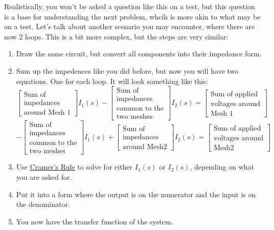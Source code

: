 \documentclass{article}
\theoremstyle{mytheoremstyle}
\theoremstyle{mytheoremstyle}
\theoremstyle{myproblemstyle}
\theoremstyle{break}
\begin{document}
Realistically, you won't be asked a question like this on a test, but this question is a base for understanding the next problem, whcih is more akin to what may be on a test. Let's talk about another scenario you may encounter, where there are now 2 loops. This is a bit more complex, but the steps are very similar:

\begin{enumerate}
	\item Draw the same circuit, but convert all components into their impedance form.
	\item Sum up the impedences like you did before, but now you will have two equations. One for each loop. It will look something like this:
	\begin{equation}
		\left.\left[\begin{array}{c}\text{Sum of}\\\text{impedances}\\\text{around Mesh 1}\end{array}\right.\right]I_1(s)-\left[\begin{array}{c}\text{Sum of}\\\text{impedances}\\\text{common to the}\\\text{two meshes}\end{array}\right]I_2(s)=\left[\begin{array}{c}\text{Sum of applied}\\\text{voltages around}\\\text{Mesh 1}\end{array}\right]
	\end{equation}
	\begin{equation}
		-\begin{bmatrix}\text{Sum of}\\\text{impedances}\\\text{common to the}\\\text{two meshes}\end{bmatrix}I_1(s)+\begin{bmatrix}\text{Sum of}\\\text{impedances}\\\text{around Mesh}2\end{bmatrix}I_2(s)=\begin{bmatrix}\text{Sum of applied}\\\text{voltages around}\\\text{Mesh}2\end{bmatrix}
	\end{equation}
	\item Use \hyperref[subsec:Cramers_Rule]{Cramer's Rule} to solve for either $I_1(s)$ or $I_2(s)$, depending on what you are asked for.
	\item Put it into a form where the output is on the numerator and the input is on the denominator.
	\item You now have the transfer function of the system.
\end{enumerate}


\end{document}
